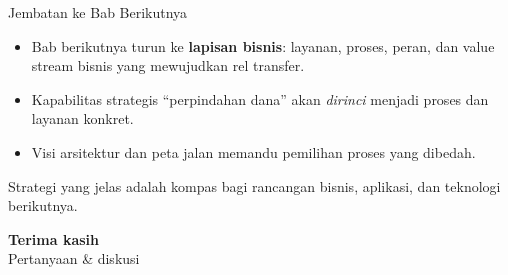\documentclass[aspectratio=169, table]{beamer}
\newcommand{\takeaway}[1]{%
  \vspace{4pt}
  {\footnotesize #1}
}
\begin{document}
\begin{frame}{Jembatan ke Bab Berikutnya}
  \vspace{8pt}
  \begin{itemize}
    \item Bab berikutnya turun ke \textbf{lapisan bisnis}: layanan, proses,
          peran, dan value stream bisnis yang mewujudkan rel transfer.
    \item Kapabilitas strategis ``perpindahan dana'' akan \emph{dirinci} menjadi
          proses dan layanan konkret.
    \item Visi arsitektur dan peta jalan memandu pemilihan proses yang dibedah.
  \end{itemize}
  \takeaway{Strategi yang jelas adalah kompas bagi rancangan bisnis, aplikasi,
  dan teknologi berikutnya.}
\end{frame}

\begin{frame}{\hfill}
  \centering
  \Huge{\textbf{Terima kasih}}\\[8pt]
  \normalsize Pertanyaan \& diskusi
\end{frame}
\end{document}
